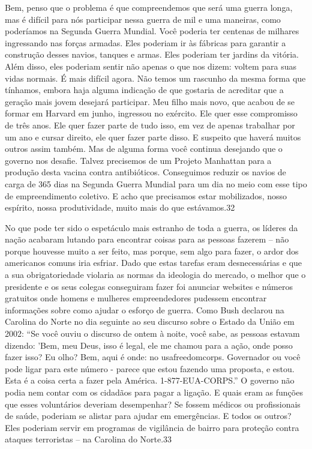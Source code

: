  \par 
Bem, penso que o problema é que compreendemos que será uma guerra longa, mas é difícil para nós participar nessa guerra de mil e uma maneiras, como poderíamos na Segunda Guerra Mundial. Você poderia ter centenas de milhares ingressando nas forças armadas. Eles poderiam ir às fábricas para garantir a construção desses navios, tanques e armas. Eles poderiam ter jardins da vitória. Além disso, eles poderiam sentir não apenas o que nos dizem: voltem para suas vidas normais. É mais difícil agora. Não temos um rascunho da mesma forma que tínhamos, embora haja alguma indicação de que gostaria de acreditar que a geração mais jovem desejará participar. Meu filho mais novo, que acabou de se formar em Harvard em junho, ingressou no exército. Ele quer esse compromisso de três anos. Ele quer fazer parte de tudo isso, em vez de apenas trabalhar por um ano e cursar direito, ele quer fazer parte disso. E suspeito que haverá muitos outros assim também. Mas de alguma forma você continua desejando que o governo nos desafie. Talvez precisemos de um Projeto Manhattan para a produção desta vacina contra antibióticos. Conseguimos reduzir os navios de carga de {\color{blue}365} dias na Segunda Guerra Mundial para um dia no meio com esse tipo de empreendimento coletivo. E acho que precisamos estar mobilizados, nosso espírito, nossa produtividade, muito mais do que estávamos.{\color{blue}32}
 \par 
No que pode ter sido o espetáculo mais estranho de toda a guerra, os líderes da nação acabaram lutando para encontrar coisas para as pessoas fazerem – não porque houvesse muito a ser feito, mas porque, sem algo para fazer, o ardor dos americanos comuns iria esfriar. Dado que estas tarefas eram desnecessárias e que a sua obrigatoriedade violaria as normas da ideologia do mercado, o melhor que o presidente e os seus colegas conseguiram fazer foi anunciar websites e números gratuitos onde homens e mulheres empreendedores pudessem encontrar informações sobre como ajudar o esforço de guerra. Como Bush declarou na Carolina do Norte no dia seguinte ao seu discurso sobre o Estado da União em 2002: “Se você ouviu o discurso de ontem à noite, você sabe, as pessoas estavam dizendo: 'Bem, meu Deus, isso é legal, ele me chamou para a ação, onde posso fazer isso? Eu olho? Bem, aqui é onde: no usafreedomcorps. Governador ou você pode ligar para este número - parece que estou fazendo uma proposta, e estou. Esta é a coisa certa a fazer pela América. 1-877-EUA-CORPS.” O governo não podia nem contar com os cidadãos para pagar a ligação. E quais eram as funções que esses voluntários deveriam desempenhar? Se fossem médicos ou profissionais de saúde, poderiam se alistar para ajudar em emergências. E todos os outros? Eles poderiam servir em programas de vigilância de bairro para proteção contra ataques terroristas – na Carolina do Norte.{\color{blue}33}
